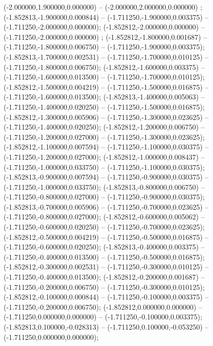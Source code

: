  (-2.000000,1.900000,0.000000) -- (-2.000000,2.000000,0.000000) ;
 (-1.852813,-1.900000,0.000844) -- (-1.711250,-1.900000,0.003375) -- (-1.711250,-2.000000,0.000000);
 (-1.852812,-2.000000,0.000000) -- (-1.711250,-2.000000,0.000000) ;
 (-1.852812,-1.800000,0.001687) -- (-1.711250,-1.800000,0.006750) -- (-1.711250,-1.900000,0.003375);
 (-1.852813,-1.700000,0.002531) -- (-1.711250,-1.700000,0.010125) -- (-1.711250,-1.800000,0.006750);
 (-1.852812,-1.600000,0.003375) -- (-1.711250,-1.600000,0.013500) -- (-1.711250,-1.700000,0.010125);
 (-1.852812,-1.500000,0.004219) -- (-1.711250,-1.500000,0.016875) -- (-1.711250,-1.600000,0.013500);
 (-1.852813,-1.400000,0.005063) -- (-1.711250,-1.400000,0.020250) -- (-1.711250,-1.500000,0.016875);
 (-1.852812,-1.300000,0.005906) -- (-1.711250,-1.300000,0.023625) -- (-1.711250,-1.400000,0.020250);
 (-1.852812,-1.200000,0.006750) -- (-1.711250,-1.200000,0.027000) -- (-1.711250,-1.300000,0.023625);
 (-1.852812,-1.100000,0.007594) -- (-1.711250,-1.100000,0.030375) -- (-1.711250,-1.200000,0.027000);
 (-1.852812,-1.000000,0.008437) -- (-1.711250,-1.000000,0.033750) -- (-1.711250,-1.100000,0.030375);
 (-1.852813,-0.900000,0.007594) -- (-1.711250,-0.900000,0.030375) -- (-1.711250,-1.000000,0.033750);
 (-1.852813,-0.800000,0.006750) -- (-1.711250,-0.800000,0.027000) -- (-1.711250,-0.900000,0.030375);
 (-1.852813,-0.700000,0.005906) -- (-1.711250,-0.700000,0.023625) -- (-1.711250,-0.800000,0.027000);
 (-1.852812,-0.600000,0.005062) -- (-1.711250,-0.600000,0.020250) -- (-1.711250,-0.700000,0.023625);
 (-1.852812,-0.500000,0.004219) -- (-1.711250,-0.500000,0.016875) -- (-1.711250,-0.600000,0.020250);
 (-1.852813,-0.400000,0.003375) -- (-1.711250,-0.400000,0.013500) -- (-1.711250,-0.500000,0.016875);
 (-1.852812,-0.300000,0.002531) -- (-1.711250,-0.300000,0.010125) -- (-1.711250,-0.400000,0.013500);
 (-1.852812,-0.200000,0.001687) -- (-1.711250,-0.200000,0.006750) -- (-1.711250,-0.300000,0.010125);
 (-1.852812,-0.100000,0.000844) -- (-1.711250,-0.100000,0.003375) -- (-1.711250,-0.200000,0.006750);
 (-1.852812,0.000000,0.000000) -- (-1.711250,0.000000,0.000000) -- (-1.711250,-0.100000,0.003375);
 (-1.852813,0.100000,-0.028313) -- (-1.711250,0.100000,-0.053250) -- (-1.711250,0.000000,0.000000);
